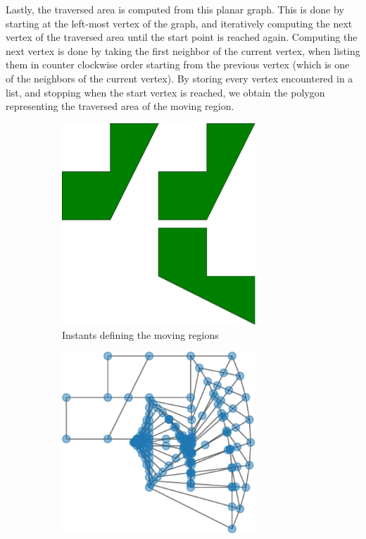 Lastly, the traversed area is computed from this planar graph. This is done by starting at the left-most vertex of the graph, and iteratively computing the next vertex of the traversed area until the start point is reached again. Computing the next vertex is done by taking the first neighbor of the current vertex, when listing them in counter clockwise order starting from the previous vertex (which is one of the neighbors of the current vertex). By storing every vertex encountered in a list, and stopping when the start vertex is reached, we obtain the polygon representing the traversed area of the moving region.

\begin{figure}[h!]
    \centering
    \begin{subfigure}{.3\textwidth}
        \centering
        \includegraphics[width=0.8\textwidth]{images/process_regions.pdf}
        \caption{Instants defining the moving regions}
    \end{subfigure}
    \hfill
    \begin{subfigure}{.3\textwidth}
        \centering
        \includegraphics[width=0.8\textwidth]{images/process_planar_graph.pdf}

\end{subfigure}
\end{figure}
